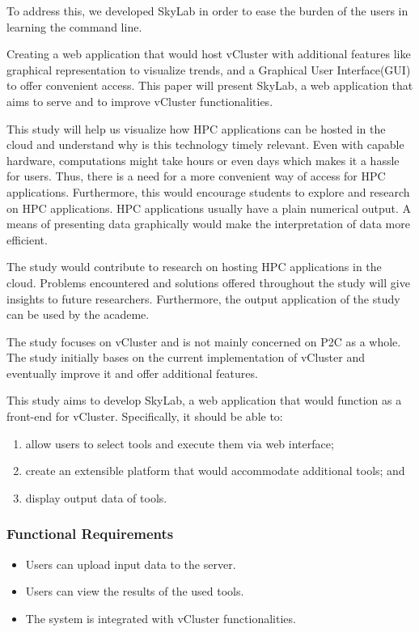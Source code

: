 To address this, we developed SkyLab in order to ease the burden of the users in learning the command line.


Creating a web application that would host vCluster with additional features like graphical representation to visualize trends, and a Graphical User Interface(GUI) to offer convenient access. This paper will present SkyLab, a web application that aims to serve and to improve vCluster functionalities.

This study will help us visualize how HPC applications can be hosted in the cloud and understand why is this technology timely relevant.  Even with capable hardware, computations might take hours or even days which makes it a hassle for users. Thus, there is a need for a more convenient way of access for HPC applications. Furthermore, this would encourage students to explore and research on HPC applications. HPC applications usually have a plain numerical output. A means of presenting data graphically would make the interpretation of data more efficient.

The study would contribute to research on hosting HPC applications in the cloud. Problems encountered and solutions offered throughout the study will give insights to future researchers. Furthermore, the output application of the study can be used by the academe.

The study focuses on vCluster and is not mainly concerned on P2C as a whole. The study initially bases on the current implementation of vCluster and eventually improve it and offer additional features\cite {Hermocilla2014}.

This study aims to develop SkyLab, a web application that would function as a front-end for vCluster. 	Specifically, it should be able to: 
	\begin{enumerate}
		\item allow users to select tools and execute them via web interface; 
        \item create an extensible platform that would accommodate additional tools; and
		\item display output data of tools.
	\end{enumerate}

\subsubsection*{Functional Requirements}
	\begin{itemize}
		\item Users can upload input data to the server.
    	\item Users can view the results of the used tools.
    	\item The system is integrated with vCluster functionalities.
    \end{itemize}

